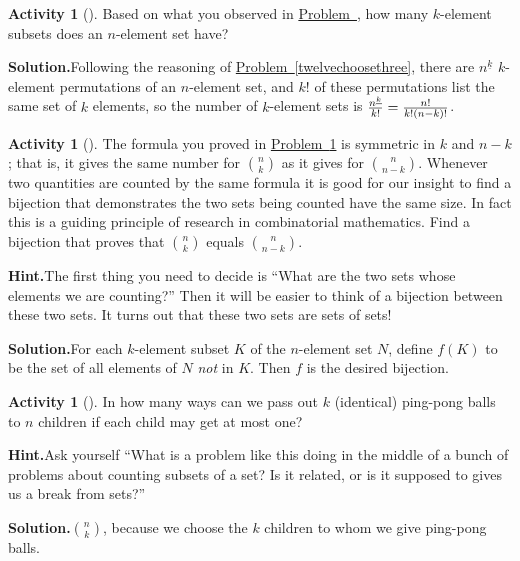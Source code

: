 \documentclass[10pt,]{book}
\theoremstyle{plain}
\theoremstyle{definition}
\newtheorem{activity}[project]{Activity}
\numberwithin{equation}{chapter}
\begin{document}
\begin{activity}[]\label{nchoosek}
Based on what you observed in \hyperref[twelvechoosethreefinal]{Problem~}, how many \(k\)-element subsets does an \(n\)-element set have?%
\par\medskip\noindent%
\textbf{Solution.}\quad Following the reasoning of \hyperref[twelvechoosethree]{Problem~\ref{twelvechoosethree}}, there are \(n^{\underline{k}}\) \(k\)-element permutations of an \(n\)-element set, and \(k!\) of these permutations list the same set of \(k\) elements, so the number of \(k\)-element sets is \({n^{\underline{k}}\over k!}= \frac{n!}{k!(n-k)!}\).%
\end{activity}
\begin{activity}[]\label{activity-36}
The formula you proved in \hyperref[nchoosek]{Problem~\ref{nchoosek}} is symmetric in \(k\) and \(n-k\); that is, it gives the same number for \(\binom{n}{k}\) as it gives for \(\binom{n}{n-k}\). Whenever two quantities are counted by the same formula it is good for our insight to find a bijection that demonstrates the two sets being counted have the same size. In fact this is a guiding principle of research in combinatorial mathematics. Find a bijection that proves that \(\binom{n}{k}\) equals \(\binom{n}{n-k}\).%
\par\medskip\noindent%
\textbf{Hint.}\quad The first thing you need to decide is ``What are the two sets whose elements we are counting?'' Then it will be easier to think of a bijection between these two sets. It turns out that these two sets are sets of sets!%
\par\medskip\noindent%
\textbf{Solution.}\quad For each \(k\)-element subset \(K\) of the \(n\)-element set \(N\), define \(f(K)\) to be the set of all elements of \(N\) \emph{not} in \(K\). Then \(f\) is the desired bijection.%
\end{activity}
\begin{activity}[]\label{ping-pong}
In how many ways can we pass out \(k\) (identical) ping-pong balls to \(n\) children if each child may get at most one?%
\par\medskip\noindent%
\textbf{Hint.}\quad Ask yourself ``What is a problem like this doing in the middle of a bunch of problems about counting subsets of a set? Is it related, or is it supposed to gives us a break from sets?''%
\par\medskip\noindent%
\textbf{Solution.}\quad \(\binom{n}{k}\), because we choose the \(k\) children to whom we give ping-pong balls.%
\end{activity}
\end{document}

